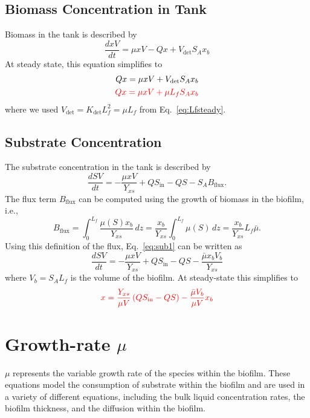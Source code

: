 \documentclass[letterpaper, twoside]{article}
\numberwithin{equation}{section}
\newcommand{\ie}{i.e.}
\begin{document}
\subsection{Biomass Concentration in Tank}
Biomass in the tank is described by
\begin{equation}
  \frac{dx V}{dt} = \mu xV - Q x +V_{\mathrm{det}} S_A x_b
\end{equation}
At steady state, this equation simplifies to
\begin{align} 
  Qx = \mu xV +V_{\mathrm{det}} S_A x_b\\
   {\color{red}
  Qx = \mu xV +\mu L_f S_A x_b
  }
\end{align}
where we used $V_{\mathrm{det}}= K_\mathrm{det} L_f^2 = \mu L_f$ from Eq.~\ref{eq:Lfsteady}.

\subsection{Substrate Concentration}
The substrate concentration in the tank is described by
\begin{equation}\label{eq:sub1}
  \frac{dS V}{dt} = -\frac{\mu x V}{Y_{xs}} + Q S_{\mathrm{in}} - Q S - S_A B_{\mathrm{flux}}.
\end{equation}
The flux term $B_\mathrm{flux}$ can be computed using the growth of biomass in the biofilm, \ie,
\begin{equation}
  B_\mathrm{flux} = \int_0^{L_f} \frac{\mu(S) x_b}{Y_{xs}} \, dz = \frac{ x_b}{Y_{xs}}\int_0^{L_f} \mu(S) \, dz = \frac{ x_b}{Y_{xs}} L_f \bar{\mu}.
\end{equation}
 Using this definition of the flux, Eq.~\ref{eq:sub1} can be written as
\begin{equation}
  \frac{dS V}{dt} = -\frac{\mu x V}{Y_{xs}} + Q S_{\mathrm{in}} - Q S -\frac{\bar{\mu} x_b V_b}{Y_{xs}}
\end{equation}
where $V_b=S_A L_f$ is the volume of the biofilm.   At steady-state this simplifies to 
\begin{equation}
 {\color{red}
   x = \frac{Y_{xs}}{\mu V}\left(Q S_{\mathrm{in}} - Q S\right) -\frac{\bar{\mu} V_b}{\mu V}x_b
 }
\end{equation}

\section{Growth-rate $\mu$}\label{sec:mu}
$\mu$ represents the variable growth rate of the species within the biofilm. These equations model the consumption of substrate within the biofilm and are used in a variety of different equations, including the bulk liquid concentration rates, the biofilm thickness, and the diffusion within the biofilm.
\end{document}
